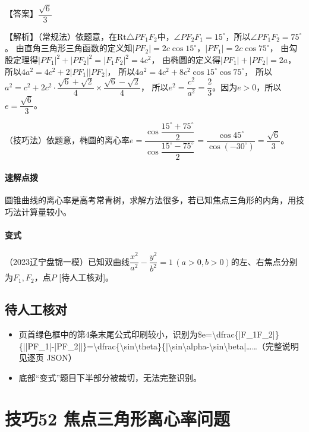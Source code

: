 \documentclass[UTF8,a4paper,11pt]{ctexart}
\begin{document}
【答案】$\dfrac{\sqrt6}{3}$

【解析】（常规法）依题意，在$\mathrm{Rt}\triangle PF_1F_2$中，$\angle PF_2F_1=15^\circ$，所以$\angle PF_1F_2=75^\circ$。
由直角三角形三角函数的定义知$|PF_2|=2c\cos15^\circ$，$|PF_1|=2c\cos75^\circ$，
由勾股定理得$|PF_1|^2+|PF_2|^2=|F_1F_2|^2=4c^2$，
由椭圆的定义得$|PF_1|+|PF_2|=2a$，
所以$4a^2=4c^2+2|PF_1||PF_2|$，
所以$4a^2=4c^2+8c^2\cos15^\circ\cos75^\circ$，
所以$a^2=c^2+2c^2\cdot\dfrac{\sqrt6+\sqrt2}{4}\times\dfrac{\sqrt6-\sqrt2}{4}$，
所以$e^2=\dfrac{c^2}{a^2}=\dfrac{2}{3}$。因为$e>0$，所以$e=\dfrac{\sqrt6}{3}$。

（技巧法）依题意，椭圆的离心率$e=\dfrac{\cos\dfrac{15^\circ+75^\circ}{2}}{\cos\dfrac{15^\circ-75^\circ}{2}}=\dfrac{\cos45^\circ}{\cos(-30^\circ)}=\dfrac{\sqrt6}{3}$。

\paragraph{速解点拨}
圆锥曲线的离心率是高考常青树，求解方法很多，若已知焦点三角形的内角，用技巧法计算量较小。

\paragraph{变式}（2023辽宁盘锦一模）已知双曲线$\dfrac{x^2}{a^2}-\dfrac{y^2}{b^2}=1\,(a>0,b>0)$的左、右焦点分别为$F_1,F_2$，点$P$
[待人工核对]。

\subsection*{待人工核对}

\begin{itemize}

\item 页首绿色框中的第4条末尾公式印刷较小，识别为\$e=\textbackslash{}dfrac\{|F\_1F\_2|\}\{||PF\_1|-|PF\_2||\}=\textbackslash{}dfrac\{\textbackslash{}sin\textbackslash{}theta\}\{|\textbackslash{}sin\textbackslash{}alpha-\textbackslash{}sin\textbackslash{}beta|……（完整说明见逐页 JSON）

\item 底部“变式”题目下半部分被裁切，无法完整识别。

\end{itemize}

\clearpage

\section{技巧52 焦点三角形离心率问题}
\end{document}
